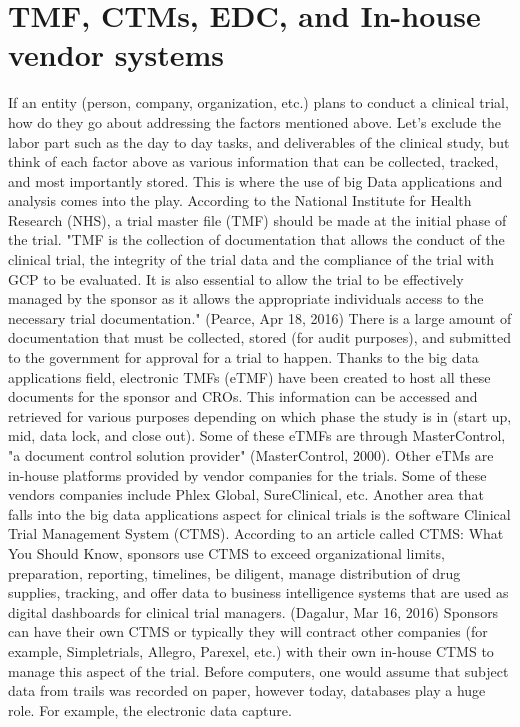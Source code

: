 \documentclass[sigconf]{acmart}
\begin{document}
{\section{TMF, CTMs, EDC, and In-house vendor systems}
If an entity (person, company, organization, etc.) plans to conduct a clinical trial, how do they go about addressing the
factors mentioned above. Let's exclude the labor part such as the day to day tasks, and deliverables of the clinical study, but think of each factor above as various information that can be collected, tracked, and most importantly stored. 
This is where the use of big Data applications and analysis comes into the play. 
According to the National Institute for Health Research (NHS), a trial master file (TMF) should be made at the initial phase of the trial. "TMF is the collection of documentation that allows the conduct of the clinical trial, the integrity of the trial data and the compliance of the trial with GCP to be evaluated.
It is also essential to allow the trial to be effectively managed by the sponsor as it allows the appropriate individuals access to the necessary trial documentation." (Pearce, Apr 18, 2016) 
There is a large amount of documentation that must be collected, stored (for audit purposes), and submitted to the government for approval for a trial to happen. 
Thanks to the big data applications field, electronic TMFs (eTMF) have been created to host all these documents for the sponsor and CROs. This information can be accessed and retrieved for various purposes depending on which phase the study is in (start up, mid, data lock, and close out). 
Some of these eTMFs are through MasterControl, "a document control solution provider" (MasterControl, 2000). Other eTMs are in-house platforms provided by vendor companies for the trials. 
Some of these vendors companies include Phlex Global, SureClinical, etc.
Another area that falls into the big data applications aspect for clinical trials is the software Clinical Trial Management System (CTMS).
According to an article called CTMS: What You Should Know, sponsors use CTMS to exceed organizational limits, preparation, reporting, timelines, be diligent, manage distribution of drug supplies, tracking, and offer data to business intelligence systems that are used as digital dashboards for clinical trial managers. (Dagalur, Mar 16, 2016) 
Sponsors can have their own CTMS or typically they will contract other companies (for example, Simpletrials, Allegro, Parexel, etc.) with their own in-house CTMS to manage this aspect of the trial. 
Before computers, one would assume that subject data from trails was recorded on paper, however today, databases play a huge role. For example, the electronic data capture.
}
\end{document}
